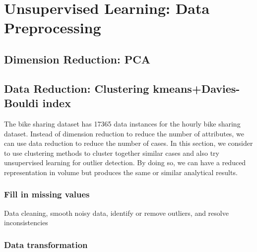 \documentclass[12pt]{article}
\begin{document}
	\section{Unsupervised Learning: Data Preprocessing}
	\subsection{Dimension Reduction: PCA }
	\label{sec:dimension-reduction}
	
	\subsection{Data Reduction: Clustering kmeans+Davies-Bouldi index}
	\label{data-reduction}
	
	The bike sharing dataset has  17365 data instances for the hourly bike sharing dataset. Instead of dimension reduction to reduce the number of attributes, we can use data reduction to reduce the number of cases. In this section, we consider to use clustering methods to cluster together similar cases and also try unsupervised learning for outlier detection. By doing so, we can have a reduced representation in volume but produces the same or similar analytical results.
	\subsubsection{Fill in missing values}
	Data cleaning, smooth noisy data, identify or remove outliers, and resolve inconsistencies
	\subsubsection{Data transformation}
	
\end{document}
